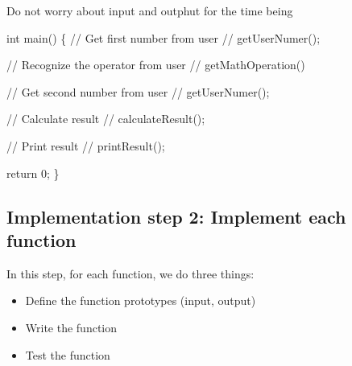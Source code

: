 \documentclass[
  letterpaper,
  DIV=11,
  numbers=noendperiod]{scrreprt}
\newenvironment{Shaded}{\begin{snugshade}}{\end{snugshade}}
\newcommand{\DecValTok}[1]{\textcolor[rgb]{0.68,0.00,0.00}{#1}}
\newcommand{\ErrorTok}[1]{\textcolor[rgb]{0.68,0.00,0.00}{#1}}
\newcommand{\FunctionTok}[1]{\textcolor[rgb]{0.28,0.35,0.67}{#1}}
\newcommand{\NormalTok}[1]{\textcolor[rgb]{0.00,0.23,0.31}{#1}}
\newcommand{\SpecialCharTok}[1]{\textcolor[rgb]{0.37,0.37,0.37}{#1}}
\providecommand{\tightlist}{%
  \setlength{\itemsep}{0pt}\setlength{\parskip}{0pt}}\usepackage{longtable,booktabs,array}
\begin{document}
Do not worry about input and outphut for the time being

\begin{Shaded}
\begin{Highlighting}[]
\NormalTok{int }\FunctionTok{main}\NormalTok{() \{}
  \SpecialCharTok{/}\ErrorTok{/}\NormalTok{ Get first number from user}
      \SpecialCharTok{/}\ErrorTok{/} \FunctionTok{getUserNumer}\NormalTok{();}
  
  \SpecialCharTok{/}\ErrorTok{/}\NormalTok{ Recognize the operator from user}
      \SpecialCharTok{/}\ErrorTok{/} \FunctionTok{getMathOperation}\NormalTok{()}
  
  \SpecialCharTok{/}\ErrorTok{/}\NormalTok{  Get second number from user}
      \SpecialCharTok{/}\ErrorTok{/} \FunctionTok{getUserNumer}\NormalTok{();}
  
  \SpecialCharTok{/}\ErrorTok{/}\NormalTok{ Calculate result}
      \SpecialCharTok{/}\ErrorTok{/} \FunctionTok{calculateResult}\NormalTok{();}
  
  \SpecialCharTok{/}\ErrorTok{/}\NormalTok{  Print result}
      \SpecialCharTok{/}\ErrorTok{/} \FunctionTok{printResult}\NormalTok{();}
  
\NormalTok{  return }\DecValTok{0}\NormalTok{;}
\NormalTok{\}}
\end{Highlighting}
\end{Shaded}

\hypertarget{implementation-step-2-implement-each-function}{%
\subsection{Implementation step 2: Implement each
function}\label{implementation-step-2-implement-each-function}}

In this step, for each function, we do three things:

\begin{itemize}
\tightlist
\item
  Define the function prototypes (input, output)
\item
  Write the function
\item
  Test the function
\end{itemize}
\end{document}
